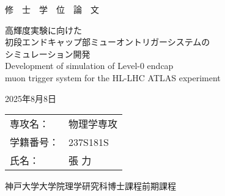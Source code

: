 \thispagestyle{empty}
\begin{center}
  \vspace*{2cm}
  {\huge 修　士　学　位　論　文}
  
  \vspace{2.5cm}
  \begin{minipage}{1\textwidth}
    \centering
    {\LARGE 高輝度実験に向けた}\\[0.8em]
    {\LARGE 初段エンドキャップ部ミューオントリガーシステムの}\\[0.8em]
    {\LARGE シミュレーション開発}\\[1.2em]
    {\LARGE \timesnewroman Development of simulation of Level-0 endcap}\\[0.8em]
    {\LARGE \timesnewroman muon trigger system for the HL-LHC ATLAS experiment}
    \end{minipage}
  
  \vspace{1.5cm}
  \hfill {\Large 2025年8月8日}
  
    \vspace{2.5cm}
    {\Large
    \begin{tabular}{ll}
        専攻名： & 物理学専攻 \\
        学籍番号： & 237S181S \\
        氏名： & 張\hspace{0.3em} 力 \\
    \end{tabular}
    }
  
  \vspace{3.5cm}
  {\Large 神戸大学大学院理学研究科博士課程前期課程}
\end{center}

\clearpage
\thispagestyle{empty}
\null
\clearpage